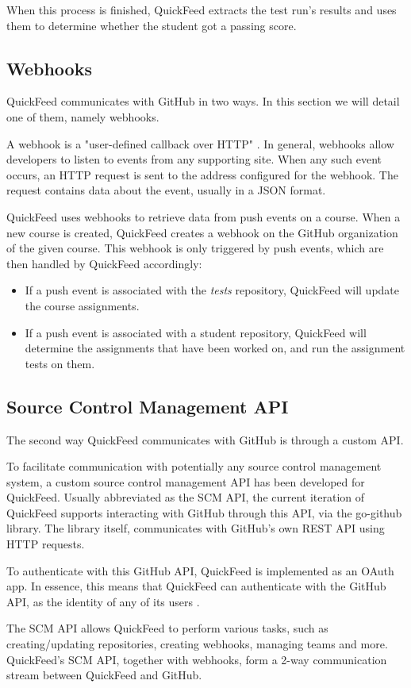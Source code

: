 When this process is finished, QuickFeed extracts the test run's results and uses them to determine whether the student got a passing score.

\subsection{Webhooks}
\label{sec:webhooks}

QuickFeed communicates with GitHub in two ways.
In this section we will detail one of them, namely webhooks.

A webhook is a "user-defined callback over HTTP" \cite{webhook}. 
In general, webhooks allow developers to listen to events from any supporting site.
When any such event occurs, an HTTP request is sent to the address configured for the webhook.
The request contains data about the event, usually in a JSON format.

QuickFeed uses webhooks to retrieve data from push events on a course.
When a new course is created, QuickFeed creates a webhook on the GitHub organization of the given course.
This webhook is only triggered by push events, which are then handled by QuickFeed accordingly:

\begin{itemize}
    \item If a push event is associated with the \textit{tests} repository, QuickFeed will update the course assignments.
    \item If a push event is associated with a student repository, QuickFeed will determine the assignments that have been worked on,
    and run the assignment tests on them.
\end{itemize}

\subsection{Source Control Management API}

The second way QuickFeed communicates with GitHub is through a custom API.

To facilitate communication with potentially any source control management system, a custom source control management API has been developed for QuickFeed.
Usually abbreviated as the SCM API, the current iteration of QuickFeed supports interacting with GitHub through this API, via the go-github library.
The library itself, communicates with GitHub's own REST API using HTTP requests.

To authenticate with this GitHub API, QuickFeed is implemented as an OAuth app.
In essence, this means that QuickFeed can authenticate with the GitHub API, as the identity of any of its users \cite{oauth}.

The SCM API allows QuickFeed to perform various tasks, such as creating/updating repositories, creating webhooks, managing teams and more.
QuickFeed's SCM API, together with webhooks, form a 2-way communication stream between QuickFeed and GitHub.